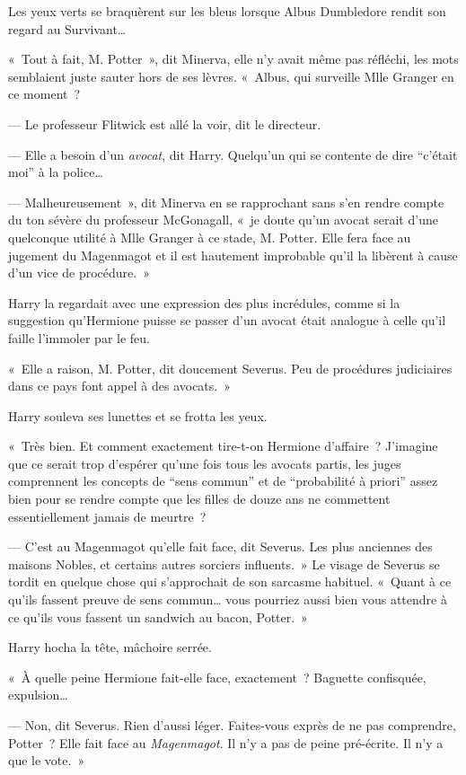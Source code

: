 Les yeux verts se braquèrent sur les bleus lorsque Albus Dumbledore rendit son regard au Survivant…

«~Tout à fait, M. Potter~», dit Minerva, elle n'y avait même pas réfléchi, les mots semblaient juste sauter hors de ses lèvres.
«~Albus, qui surveille Mlle Granger en ce moment~?

--- Le professeur Flitwick est allé la voir, dit le directeur.

--- Elle a besoin d'un \emph{avocat}, dit Harry.
Quelqu'un qui se contente de dire “c'était moi” à la police…

--- Malheureusement~», dit Minerva en se rapprochant sans s'en rendre compte du ton sévère du professeur McGonagall, «~je doute qu'un avocat serait d'une quelconque utilité à Mlle Granger à ce stade, M. Potter.
Elle fera face au jugement du Magenmagot et il est hautement improbable qu'il la libèrent à cause d'un vice de procédure.~»

Harry la regardait avec une expression des plus incrédules, comme si la suggestion qu'Hermione puisse se passer d'un avocat était analogue à celle qu'il faille l'immoler par le feu.

«~Elle a raison, M. Potter, dit doucement Severus.
Peu de procédures judiciaires dans ce pays font appel à des avocats.~»

Harry souleva ses lunettes et se frotta les yeux.

«~Très bien.
Et comment exactement tire-t-on Hermione d'affaire~?
J'imagine que ce serait trop d'espérer qu'une fois tous les avocats partis, les juges comprennent les concepts de “sens commun” et de “probabilité à priori” assez bien pour se rendre compte que les filles de douze ans ne commettent essentiellement jamais de meurtre~?

--- C'est au Magenmagot qu'elle fait face, dit Severus.
Les plus anciennes des maisons Nobles, et certains autres sorciers influents.~»
Le visage de Severus se tordit en quelque chose qui s'approchait de son sarcasme habituel.
«~Quant à ce qu'ils fassent preuve de sens commun… vous pourriez aussi bien vous attendre à ce qu'ils vous fassent un sandwich au bacon, Potter.~»

Harry hocha la tête, mâchoire serrée.

«~À quelle peine Hermione fait-elle face, exactement~?
Baguette confisquée, expulsion…

--- Non, dit Severus.
Rien d'aussi léger.
Faites-vous exprès de ne pas comprendre, Potter~?
Elle fait face au \emph{Magenmagot}.
Il n'y a pas de peine pré-écrite.
Il n'y a que le vote.~»

